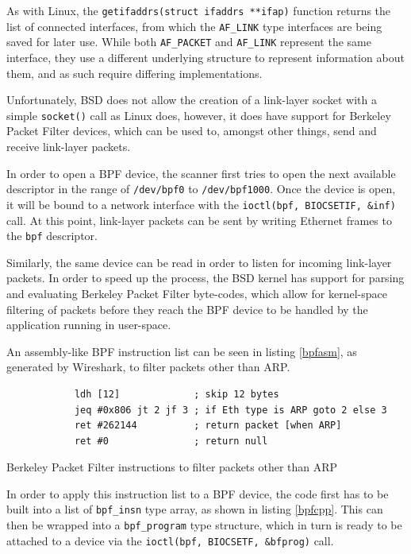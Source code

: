 \documentclass[a4paper,12pt]{article}
\begin{document}
	As with Linux, the \texttt{getifaddrs(struct ifaddrs **ifap)} function returns the list of connected interfaces, from which the \texttt{AF_LINK} type interfaces are being saved for later use. While both \texttt{AF_PACKET} and \texttt{AF_LINK} represent the same interface, they use a different underlying structure to represent information about them, and as such require differing implementations.
	
	Unfortunately, BSD does not allow the creation of a link-layer socket with a simple \texttt{socket()} call as Linux does, however, it does have support for Berkeley Packet Filter devices, which can be used to, amongst other things, send and receive link-layer packets.
	
	In order to open a BPF device, the scanner first tries to open the next available descriptor in the range of \texttt{/dev/bpf0} to \texttt{/dev/bpf1000}. Once the device is open, it will be bound to a network interface with the \texttt{ioctl(bpf, BIOCSETIF, &inf)} call. At this point, link-layer packets can be sent by writing Ethernet frames to the \texttt{bpf} descriptor.
	
	Similarly, the same device can be read in order to listen for incoming link-layer packets. In order to speed up the process, the BSD kernel has support for parsing and evaluating Berkeley Packet Filter byte-codes, which allow for kernel-space filtering of packets before they reach the BPF device to be handled by the application running in user-space.
	
	An assembly-like BPF instruction list can be seen in listing \ref{bpfasm}, as generated by Wireshark, to filter packets other than ARP.
	
	\begin{listing}[H]
		\begin{verbatim}
			ldh [12]             ; skip 12 bytes
			jeq #0x806 jt 2 jf 3 ; if Eth type is ARP goto 2 else 3
			ret #262144          ; return packet [when ARP]
			ret #0               ; return null
		\end{verbatim}
		\caption{Berkeley Packet Filter instructions to filter packets other than ARP}
		\label{bpfasm}
	\end{listing}
	
	In order to apply this instruction list to a BPF device, the code first has to be built into a list of \texttt{bpf_insn} type array, as shown in listing \ref{bpfcpp}. This can then be wrapped into a \texttt{bpf_program} type structure, which in turn is ready to be attached to a device via the \texttt{ioctl(bpf, BIOCSETF, &bfprog)} call.
	
\end{document}

